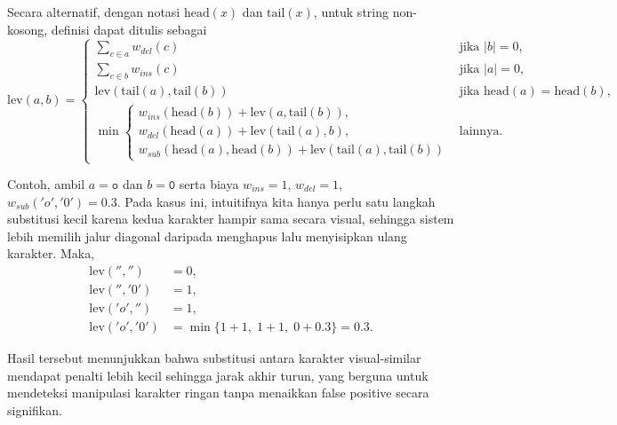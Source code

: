 Secara alternatif, dengan notasi \(\mathrm{head}(x)\) dan \(\mathrm{tail}(x)\), untuk string non-kosong, definisi dapat ditulis sebagai
$$
    \mathrm{lev}(a,b)=\begin{cases}
        \sum_{c\in a} w_{del}(c)                                                                                 & \text{jika } |b|=0,                             \\
        \sum_{c\in b} w_{ins}(c)                                                                                 & \text{jika } |a|=0,                             \\
        \mathrm{lev}(\mathrm{tail}(a),\mathrm{tail}(b))                                                          & \text{jika } \mathrm{head}(a)=\mathrm{head}(b), \\
        \min\left\{\begin{array}{l}
                       w_{ins}(\mathrm{head}(b))+\mathrm{lev}(a,\mathrm{tail}(b)), \\
                       w_{del}(\mathrm{head}(a))+\mathrm{lev}(\mathrm{tail}(a),b), \\
                       w_{sub}(\mathrm{head}(a),\mathrm{head}(b))+\mathrm{lev}(\mathrm{tail}(a),\mathrm{tail}(b))
                   \end{array}\right. & \text{lainnya.}
    \end{cases}
$$

Contoh, ambil $a=\texttt{o}$ dan $b=\texttt{0}$ serta biaya $w_{ins}=1$, $w_{del}=1$, $w_{sub}('o','0')=0.3$. Pada kasus ini, intuitifnya kita hanya perlu satu langkah substitusi kecil karena kedua karakter hampir sama secara visual, sehingga sistem lebih memilih jalur diagonal daripada menghapus lalu menyisipkan ulang karakter. Maka,
\begin{align*}
    \mathrm{lev}('', '')  & = 0,                               \\
    \mathrm{lev}('', '0') & = 1,                               \\
    \mathrm{lev}('o', '') & = 1,                               \\
    \mathrm{lev}('o','0') & = \min\{1+1,\;1+1,\;0+0.3\} = 0.3.
\end{align*}

Hasil tersebut menunjukkan bahwa substitusi antara karakter visual-similar mendapat penalti lebih kecil sehingga jarak akhir turun, yang berguna untuk mendeteksi manipulasi karakter ringan tanpa menaikkan false positive secara signifikan.


